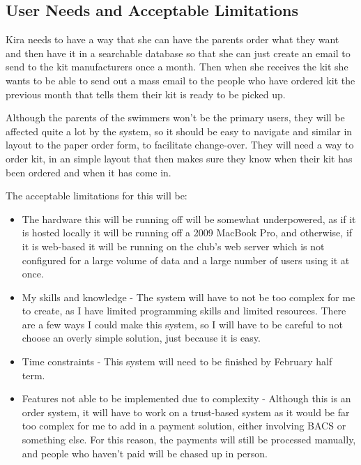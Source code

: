 \documentclass[
11pt, %
a4paper, %
oneside, %
headinclude,footinclude, %
BCOR5mm, %
]{scrartcl}
\begin{document}
\subsection{User Needs and Acceptable Limitations}
 Kira needs to have a way that she can have the parents order what they want and then have it in a searchable database so that she can just create an email to send to the kit manufacturers once a month. Then when she receives the kit she wants to be able to send out a mass email to the people who have ordered kit the previous month that tells them their kit is ready to be picked up. 
 \par Although the parents of the swimmers won't be the primary users, they will be affected quite a lot by the system, so it should be easy to navigate and similar in layout to the paper order form, to facilitate change-over. They will need a way to order kit, in an simple layout that then makes sure they know when their kit has been ordered and when it has come in.
 \par The acceptable limitations for this will be:\begin{itemize}
 	\item The hardware this will be running off will be somewhat underpowered, as if it is hosted locally it will be running off a 2009 MacBook Pro, and otherwise, if it is web-based it will be running on the club's web server which is not configured for a large volume of data and a large number of users using it at once.
 	\item My skills and knowledge - The system will have to not be too complex for me to create, as I have limited programming skills and limited resources. There are a few ways I could make this system, so I will have to be careful to not choose an overly simple solution, just because it is easy.
 	\item Time constraints - This system will need to be finished by February half term.
 	\item Features not able to be implemented due to complexity - Although this is an order system, it will have to work on a trust-based system as it would be far too complex for me to add in a payment solution, either involving BACS or something else. For this reason, the payments will still be processed manually, and people who haven't paid will be chased up in person. 
 	
 \end{itemize}
\end{document}

